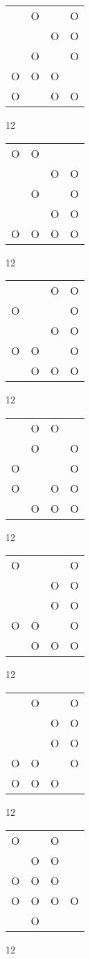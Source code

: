 \begin{tabular}{|m{0.2cm}m{0.2cm}m{0.2cm}m{0.2cm}|}\hline
 &O& &O\\
 & &O&O\\
 &O& &O\\
O&O&O& \\
O& &O&O\\
\hline\end{tabular}12
\begin{tabular}{|m{0.2cm}m{0.2cm}m{0.2cm}m{0.2cm}|}\hline
O&O& & \\
 & &O&O\\
 &O& &O\\
 & &O&O\\
O&O&O&O\\
\hline\end{tabular}12
\begin{tabular}{|m{0.2cm}m{0.2cm}m{0.2cm}m{0.2cm}|}\hline
 & &O&O\\
O& & &O\\
 & &O&O\\
O&O& &O\\
 &O&O&O\\
\hline\end{tabular}12
\begin{tabular}{|m{0.2cm}m{0.2cm}m{0.2cm}m{0.2cm}|}\hline
 &O&O& \\
 &O& &O\\
O& & &O\\
O& &O&O\\
 &O&O&O\\
\hline\end{tabular}12
\begin{tabular}{|m{0.2cm}m{0.2cm}m{0.2cm}m{0.2cm}|}\hline
O& & &O\\
 & &O&O\\
 & &O&O\\
O&O& &O\\
 &O&O&O\\
\hline\end{tabular}12
\begin{tabular}{|m{0.2cm}m{0.2cm}m{0.2cm}m{0.2cm}|}\hline
 &O& &O\\
 & &O&O\\
 & &O&O\\
O&O& &O\\
O&O&O& \\
\hline\end{tabular}12
\begin{tabular}{|m{0.2cm}m{0.2cm}m{0.2cm}m{0.2cm}|}\hline
O& &O& \\
 &O&O& \\
O&O&O& \\
O&O&O&O\\
 &O& & \\
\hline\end{tabular}12
